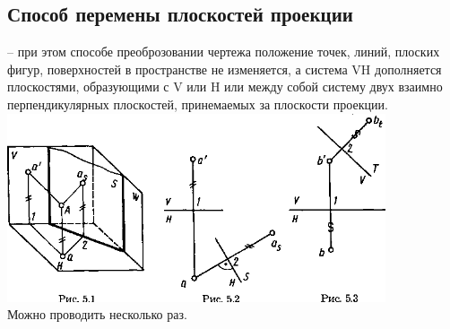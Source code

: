 \documentclass[a4paper, 12pt]{article}
\begin{document}
\subsection{Способ перемены плоскостей проекции}
-- при этом способе преоброзовании чертежа положение точек, линий, плоских фигур, поверхностей в пространстве не изменяется, а система VH дополняется плоскостями, образующими с V или H или между собой систему двух взаимно перпендикулярных плоскостей, принемаемых за плоскости проекции.\\
\includegraphics{img/521.png}\\

Можно проводить несколько раз.\\
\end{document}
